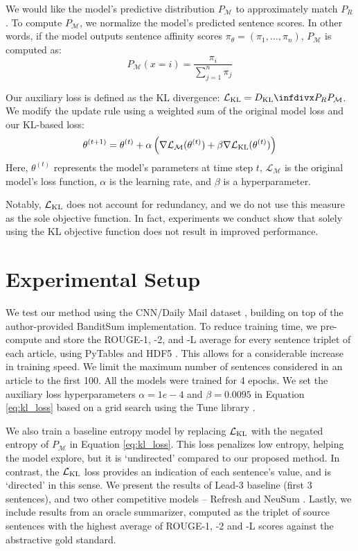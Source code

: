We would like the model's predictive distribution $P_\mathcal{M}$ to approximately match $P_R$. To compute $P_\mathcal{M}$, we normalize the model's predicted sentence scores. In other words, if the model outputs sentence affinity scores $\pi_\theta = (\pi_1,\dots,\pi_n)$, $P_\mathcal{M}$ is computed as:
\begin{equation}
    P_\mathcal{M}(x = i) = \frac{\pi_i}{\sum_{j=1}^n \pi_j}
\end{equation}

Our auxiliary loss is defined as the KL divergence: $\mathcal{L}_{\KL} = \infdiv{P_R}{P_\mathcal{M}}$. We modify the update rule using a weighted sum of the original model loss and our KL-based loss:
\begin{equation}
\label{eq:kl_loss}
    \theta^{(t+1)} = \theta^{(t)} + \alpha \left( \nabla \mathcal{L}_{\mathcal{M}}(\theta^{(t)}) + \beta \nabla \mathcal{L}_{\operatorname{KL}}(\theta^{(t)}) \right)
\end{equation}
Here, $\theta^{(t)}$ represents the model's parameters at time step $t$, $\mathcal{L}_{\mathcal{M}}$ is the original model's loss function, $\alpha$ is the learning rate, and $\beta$ is a hyperparameter.

Notably, $\mathcal{L}_{\operatorname{KL}}$ does not account for redundancy, and we do not use this measure as the sole objective function. In fact, experiments we conduct show that solely using the KL objective function does not result in improved performance.

\section{Experimental Setup}
We test our method using the CNN/Daily Mail dataset \parencite{hermann2015teaching}, building on top of the author-provided BanditSum implementation. To reduce training time, we pre-compute and store the ROUGE-1, -2, and -L average for every sentence triplet of each article, using PyTables and HDF5 \parencite{pytables, hdf5}. This allows for a considerable increase in training speed. We limit the maximum number of sentences considered in an article to the first 100. All the models were trained for 4 epochs. We set the auxiliary loss hyperparameters $\alpha=1e-4$ and $\beta=0.0095$ in Equation \ref{eq:kl_loss} based on a grid search using the Tune library \parencite{tune}.

We also train a baseline entropy model by replacing $\mathcal{L}_{\operatorname{KL}}$ with the negated entropy of $P_\mathcal{M}$ in Equation \ref{eq:kl_loss}. This loss penalizes low entropy, helping the model explore, but it is `undirected' compared to our proposed method. In contrast, the $\mathcal{L}_{\operatorname{KL}}$ loss provides an indication of each sentence's value, and is `directed' in this sense. We present the results of Lead-3 baseline (first 3 sentences), and two other competitive models -- Refresh and NeuSum \parencite{DBLP:Narayan/2018, neusum}. Lastly, we include results from an oracle summarizer, computed as the triplet of source sentences with the highest average of ROUGE-1, -2 and -L scores against the abstractive gold standard.


